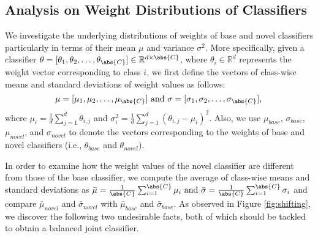 \subsection{Analysis on Weight Distributions of Classifiers} 

We investigate the underlying distributions of weights of base and novel classifiers particularly in terms of their mean $\mu$ and variance $\sigma^2$. More specifically, given a classifier $\theta = [\theta_1, \theta_2, \ldots, \theta_{\abs{C}}] \in \mathbb{R}^{d \times \abs{C}}$, where $\theta_i \in \mathbb{R}^{d} $ represents the weight vector corresponding to class $i$, we first define the vectors of class-wise means and standard deviations of weight values as follows:
\begin{equation} \label{eq:map}
  \mu = 
  [\mu_1,\mu_2,\ldots,\mu_{\abs{C}}] \text{ and } \sigma = [\sigma_1,\sigma_2,\ldots,\sigma_{\abs{C}}], \nonumber \\
\end{equation}
where $\mu_i = \frac{1}{d} \sum_{j=1}^{d}{\theta_{i, j}}$ and $\sigma_i^2 = \frac{1}{d} \sum_{j=1}^{d}{(\theta_{i, j}-\mu_i)^2}$. Also, we use $\mu_{base}$, $\sigma_{base}$, $\mu_{novel}$, and $\sigma_{novel}$ to denote the vectors corresponding to the weights of base and novel classifiers (i.e., $\theta_{base}$ and $\theta_{novel}$). 

In order to examine how the weight values of the novel classifier are different from those of the base classifier, we compute the average of class-wise means and standard deviations as $\bar \mu = \frac{1}{\abs{C}} \sum_{i=1}^{\abs{C}}{\mu_i} \text{ and } \bar \sigma = \frac{1}{\abs{C}} \sum_{i=1}^{\abs{C}}{\sigma_i}$ and compare $\bar \mu_{novel}$ and $\bar \sigma_{novel}$ with $\bar \mu_{base}$ and $\bar \sigma_{base}$. As observed in Figure \ref{fig:shifting}, we discover the following two undesirable facts, both of which should be tackled to obtain a balanced joint classifier.







